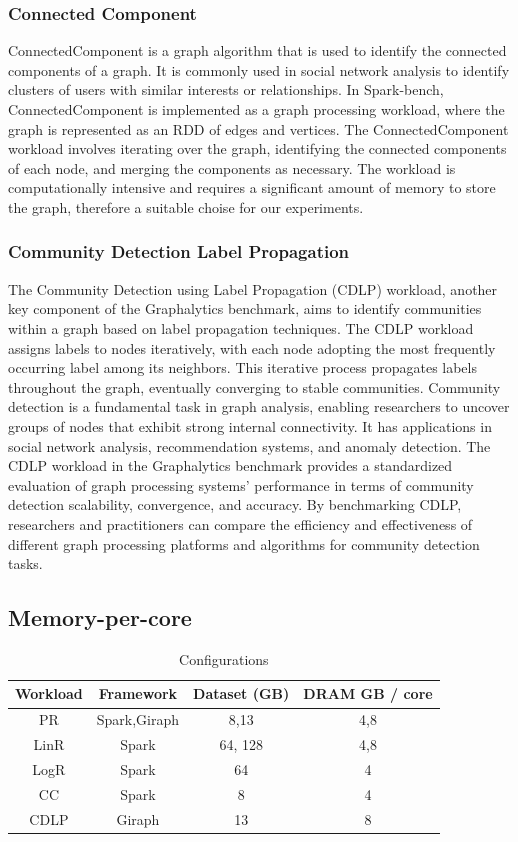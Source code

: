\subsubsection{Connected Component}
ConnectedComponent is a graph algorithm that is used to identify the
connected components of a graph. It is commonly used in social network
analysis to identify clusters of users with similar interests or
relationships. In Spark-bench, ConnectedComponent is implemented as a
graph processing workload, where the graph is represented as an RDD of
edges and vertices. The ConnectedComponent workload involves iterating
over the graph, identifying the connected components of each node, and
merging the components as necessary. The workload is computationally
intensive and requires a significant amount of memory to store the
graph, therefore a suitable choise for our experiments.

\subsubsection{Community Detection Label Propagation}
The Community Detection using Label Propagation (CDLP) workload, another key component of the Graphalytics benchmark, aims to identify communities within a graph based on label propagation techniques. The CDLP workload assigns labels to nodes iteratively, with each node adopting the most frequently occurring label among its neighbors. This iterative process propagates labels throughout the graph, eventually converging to stable communities. Community detection is a fundamental task in graph analysis, enabling researchers to uncover groups of nodes that exhibit strong internal connectivity. It has applications in social network analysis, recommendation systems, and anomaly detection. The CDLP workload in the Graphalytics benchmark provides a standardized evaluation of graph processing systems' performance in terms of community detection scalability, convergence, and accuracy. By benchmarking CDLP, researchers and practitioners can compare the efficiency and effectiveness of different graph processing platforms and algorithms for community detection tasks.

\subsection{Memory-per-core}

\begin{table}[thbp]
  \centering
  \caption{Configurations}
  \label{tab:setups}
  \begin{tabular}{|c|c|c|c|}
    \hline
	  \textbf{Workload} & \textbf{Framework} & \textbf{Dataset (GB)} & \textbf{DRAM GB / core} \\
    \hline
	  PR & Spark,Giraph & 8,13 & 4,8 \\
	  LinR & Spark & 64, 128 & 4,8 \\
    	LogR & Spark & 64 & 4 \\
	  CC & Spark & 8 & 4 \\
	  CDLP & Giraph & 13 & 8 \\
    \hline
  \end{tabular}
\end{table}


